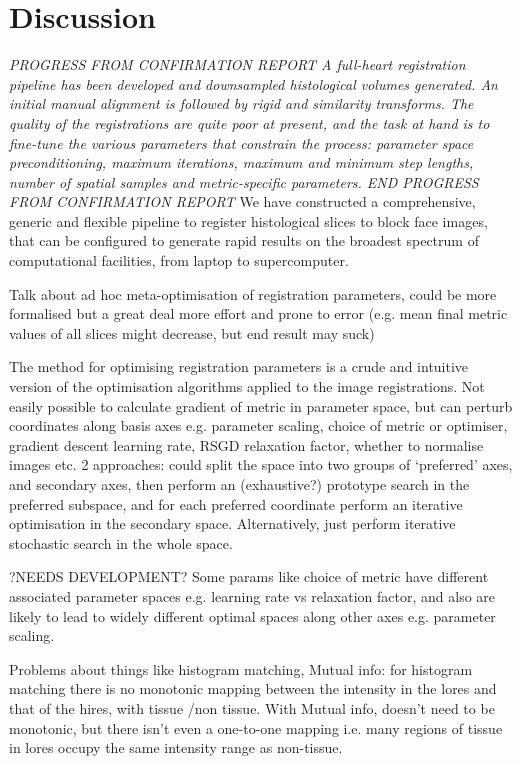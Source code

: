 \section{Discussion} %
\label{sec:discussion}

\textit{PROGRESS FROM CONFIRMATION REPORT 
A full-heart registration pipeline has been developed and downsampled histological volumes generated. An initial manual alignment is followed by rigid and similarity transforms. The quality of the registrations are quite poor at present, and the task at hand is to fine-tune the various parameters that constrain the process: parameter space preconditioning, maximum iterations, maximum and minimum step lengths, number of spatial samples and metric-specific parameters.
END PROGRESS FROM CONFIRMATION REPORT
}
    We have constructed a comprehensive, generic and flexible pipeline to register histological slices to block face images, that can be configured to generate rapid results on the broadest spectrum of computational facilities, from laptop to supercomputer.
    
    Talk about ad hoc meta-optimisation of registration parameters, could be more formalised but a great deal more effort and prone to error (e.g. mean final metric values of all slices might decrease, but end result may suck)
    
    The method for optimising registration parameters is a crude and intuitive version of the optimisation algorithms applied to the image registrations. Not easily possible to calculate gradient of metric in parameter space, but can perturb coordinates along basis axes e.g. parameter scaling, choice of metric or optimiser, gradient descent learning rate, RSGD relaxation factor, whether to normalise images etc. 2 approaches: could split the space into two groups of `preferred' axes, and secondary axes, then perform an (exhaustive?) prototype search in the preferred subspace, and for each preferred coordinate perform an iterative optimisation in the secondary space. Alternatively, just perform iterative stochastic search in the whole space.
    
    ?NEEDS DEVELOPMENT? Some params like choice of metric have different associated parameter spaces e.g. learning rate vs relaxation factor, and also are likely to lead to widely different optimal spaces along other axes e.g. parameter scaling.
    
    Problems about things like histogram matching, Mutual info: for histogram matching there is no monotonic mapping between the intensity in the lores and that of the hires, with tissue /non tissue. With Mutual info, doesn't need to be monotonic, but there isn't even a one-to-one mapping i.e. many regions of tissue in lores occupy the same intensity range as non-tissue.
    
